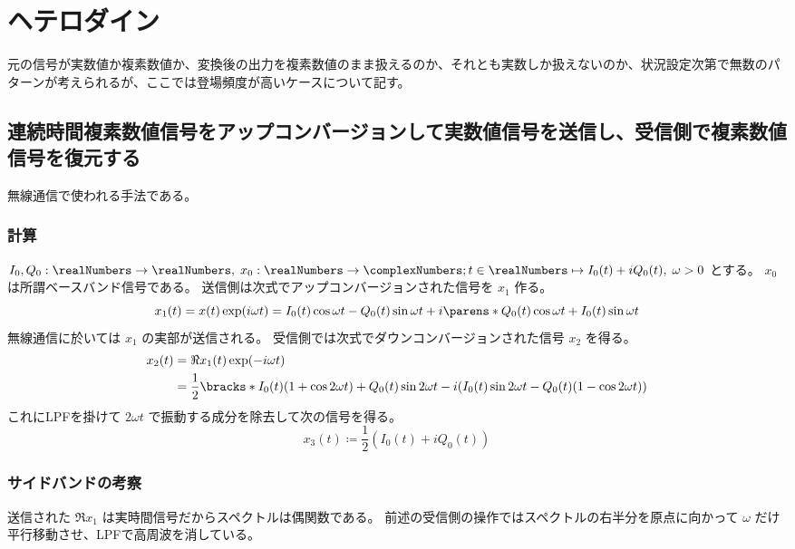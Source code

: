 \chapter{ヘテロダイン}
    元の信号が実数値か複素数値か、変換後の出力を複素数値のまま扱えるのか、それとも実数しか扱えないのか、状況設定次第で無数のパターンが考えられるが、ここでは登場頻度が高いケースについて記す。
    \section{連続時間複素数値信号をアップコンバージョンして実数値信号を送信し、受信側で複素数値信号を復元する}
        無線通信で使われる手法である。
        \subsection{計算}
            $I_0, Q_0:\realNumbers\to\realNumbers,\;x_0:\realNumbers\to\complexNumbers; t\in\realNumbers\mapsto I_0(t) + iQ_0(t),\;\omega > 0$ とする。
            $x_0$ は所謂ベースバンド信号である。
            送信側は次式でアップコンバージョンされた信号を $x_1$ 作る。
            \[ x_1(t) = x(t)\exp(i\omega t) = I_0(t)\cos\omega t - Q_0(t)\sin\omega t + i\parens*{Q_0(t)\cos\omega t + I_0(t)\sin\omega t} \]
            無線通信に於いては $x_1$ の実部が送信される。
            受信側では次式でダウンコンバージョンされた信号 $x_2$ を得る。
            \begin{align*}
                x_2(t) &= \Re{x_1(t)}\exp(-i\omega t) \\
                &= \frac{1}{2}\bracks*{I_0(t)(1+\cos 2\omega t) + Q_0(t)\sin 2\omega t - i(I_0(t)\sin 2\omega t - Q_0(t)(1-\cos 2\omega t))}
            \end{align*}
            これにLPFを掛けて $2\omega t$ で振動する成分を除去して次の信号を得る。
            \[ x_3(t) \coloneqq \frac{1}{2}(I_0(t) + iQ_0(t)) \]
        \subsection{サイドバンドの考察}
            送信された $\Re{x_1}$ は実時間信号だからスペクトルは偶関数である。
            前述の受信側の操作ではスペクトルの右半分を原点に向かって $\omega$ だけ平行移動させ、LPFで高周波を消している。
